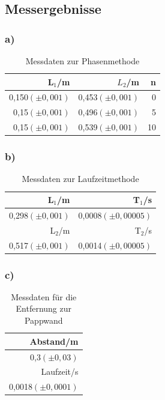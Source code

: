 \documentclass[12pt]{scrartcl}
\begin{document}
\subsection{Messergebnisse}
\subsubsection{a)}

\begin{table}[H]
\caption{Messdaten zur Phasenmethode}
\begin{center}
\begin{tabular}{|r|r|r|}
\hline
L$_1$/m & $L_2$/m & n \\ \hline
0,150$(\pm 0,001)$ & 0,453$(\pm 0,001)$ & 0 \\ \hline
0,15$(\pm 0,001)$ & 0,496$(\pm 0,001)$ & 5 \\ \hline
0,15$(\pm 0,001)$ & 0,539$(\pm 0,001)$ & 10 \\ \hline
\end{tabular}
\end{center}
\label{tab:aufgabe2_a}
\end{table}

\subsubsection{b)}

\begin{table}[H]
\caption{Messdaten zur Laufzeitmethode}
\begin{center}
\begin{tabular}{|r|r|}
\hline
L$_1$/m & T$_1$/s \\ \hline
0,298$(\pm 0,001)$ & 0,0008$(\pm 0,00005)$ \\ \hline
L$_2$/m & T$_2$/s \\ \hline
0,517$(\pm 0,001)$ & 0,0014$(\pm 0,00005)$ \\ \hline
\end{tabular}
\end{center}
\label{tab:aufgabe2_b}
\end{table}

\subsubsection{c)}

\begin{table}[H]
\caption{Messdaten für die Entfernung zur Pappwand}
\begin{center}
\begin{tabular}{|r|}
\hline
Abstand/m \\ \hline
0,3$(\pm 0,03)$ \\ \hline
Laufzeit/s \\ \hline
0,0018$(\pm 0,0001)$ \\ \hline
\end{tabular}
\end{center}
\label{tab:aufgabe2_c}
\end{table}
\end{document}
